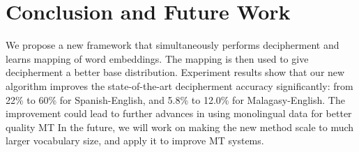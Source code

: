 \section{Conclusion and Future Work}
We propose a new framework that simultaneously performs decipherment and learns mapping of word embeddings. The mapping is then used to give decipherment a better base distribution. Experiment results show that our new algorithm improves the state-of-the-art decipherment accuracy significantly: from 22\% to 60\% for Spanish-English, and 5.8\% to 12.0\% for Malagasy-English. The improvement could lead to further advances in using monolingual data for better quality MT
In the future, we will work on making the new method scale to much larger vocabulary size, and apply it to improve MT systems.